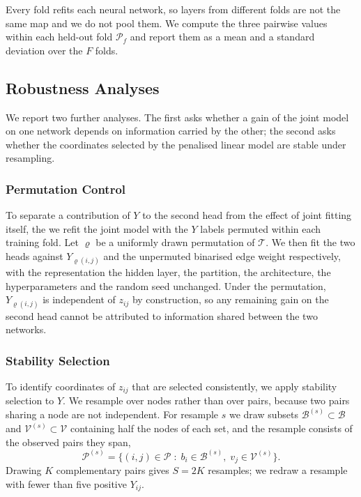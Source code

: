 Every fold refits each neural network, so layers from different folds are not the same map and we do not
pool them. We compute the three pairwise values within each held-out fold \(\mathcal{P}_{f}\) and report
them as a mean and a standard deviation over the \(F\) folds.

\subsection{Robustness Analyses}
\label{sec:robustness}

We report two further analyses. The first asks whether a gain of the joint model on one network depends on information carried by the other; the second asks whether the
coordinates selected by the penalised linear model are stable under resampling.

\subsubsection{Permutation Control}
\label{sec:shuffley}

To separate a contribution of \(Y\) to the second head from the effect of joint fitting itself, the
we refit the joint model with the \(Y\) labels permuted within each training fold. Let
\(\varrho\) be a uniformly drawn permutation of \(\mathcal{T}\). We then fit the two heads against
\(Y_{\varrho(i,j)}\) and the unpermuted binarised edge weight respectively, with the representation
the hidden layer, the partition, the architecture, the hyperparameters and the random seed unchanged.
Under the permutation, \(Y_{\varrho(i,j)}\) is independent of \(z_{ij}\) by construction, so any
remaining gain on the second head cannot be attributed to information shared between the two
networks.

\subsubsection{Stability Selection}
\label{sec:stability}

To identify coordinates of \(z_{ij}\) that are selected consistently, we apply stability selection
\citep{meinshausen2010} to \(Y\). We resample over nodes rather than over pairs, because two pairs
sharing a node are not independent. For resample \(s\) we draw subsets
\(\mathcal{B}^{(s)}\subset\mathcal{B}\) and \(\mathcal{V}^{(s)}\subset\mathcal{V}\) containing half the
nodes of each set, and the resample consists of the observed pairs they span,
\begin{equation}\label{eq:subsample}
 \mathcal{P}^{(s)}=\bigl\{(i,j)\in\mathcal{P}\;:\;b_{i}\in\mathcal{B}^{(s)},\;v_{j}\in\mathcal{V}^{(s)}\bigr\}.
\end{equation}
Drawing \(K\) complementary pairs \citep{shah2013} gives \(S=2K\) resamples; we redraw a resample with fewer
than five positive \(Y_{ij}\).


